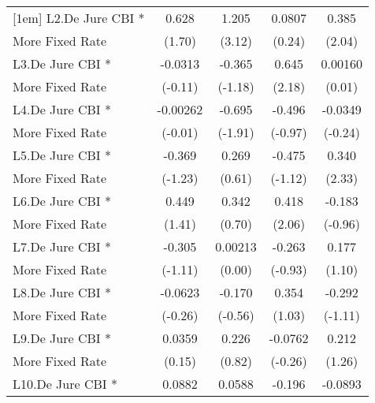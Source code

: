 {\begin{tabular}{l*{4}{c}}
[1em]
L2.De Jure CBI *    &       0.628         &       1.205\sym{**} &      0.0807         &       0.385\sym{*}  \\
More Fixed Rate     &      (1.70)         &      (3.12)         &      (0.24)         &      (2.04)         \\
[1em]
L3.De Jure CBI *    &     -0.0313         &      -0.365         &       0.645\sym{*}  &     0.00160         \\
More Fixed Rate     &     (-0.11)         &     (-1.18)         &      (2.18)         &      (0.01)         \\
[1em]
L4.De Jure CBI *    &    -0.00262         &      -0.695         &      -0.496         &     -0.0349         \\
More Fixed Rate     &     (-0.01)         &     (-1.91)         &     (-0.97)         &     (-0.24)         \\
[1em]
L5.De Jure CBI *    &      -0.369         &       0.269         &      -0.475         &       0.340\sym{*}  \\
More Fixed Rate     &     (-1.23)         &      (0.61)         &     (-1.12)         &      (2.33)         \\
[1em]
L6.De Jure CBI *    &       0.449         &       0.342         &       0.418\sym{*}  &      -0.183         \\
More Fixed Rate     &      (1.41)         &      (0.70)         &      (2.06)         &     (-0.96)         \\
[1em]
L7.De Jure CBI *    &      -0.305         &     0.00213         &      -0.263         &       0.177         \\
More Fixed Rate     &     (-1.11)         &      (0.00)         &     (-0.93)         &      (1.10)         \\
[1em]
L8.De Jure CBI *    &     -0.0623         &      -0.170         &       0.354         &      -0.292         \\
More Fixed Rate     &     (-0.26)         &     (-0.56)         &      (1.03)         &     (-1.11)         \\
[1em]
L9.De Jure CBI *    &      0.0359         &       0.226         &     -0.0762         &       0.212         \\
More Fixed Rate     &      (0.15)         &      (0.82)         &     (-0.26)         &      (1.26)         \\
[1em]
L10.De Jure CBI *   &      0.0882         &      0.0588         &      -0.196         &     -0.0893         \\

\end{tabular}}

